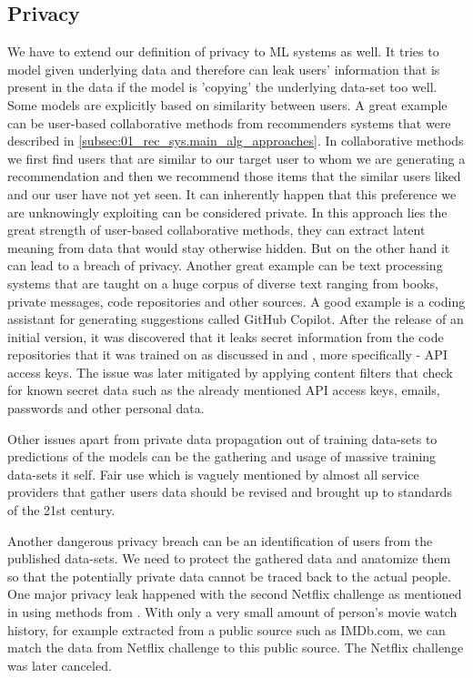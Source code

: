 \subsection{Privacy}
We have to extend our definition of privacy to ML systems as well. It tries to model given underlying data and therefore can leak users' information that is present in the data if the model is 'copying' the underlying data-set too well. Some models are explicitly based on similarity between users. A great example can be user-based collaborative methods from recommenders systems that were described in \ref{subsec:01_rec_sys.main_alg_approaches}. In collaborative methods we first find users that are similar to our target user to whom we are generating a recommendation and then we recommend those items that the similar users liked and our user have not yet seen. It can inherently happen that this preference we are unknowingly exploiting can be considered private. In this approach lies the great strength of user-based collaborative methods, they can extract latent meaning from data that would stay otherwise hidden. But on the other hand it can lead to a breach of privacy.
Another great example can be text processing systems that are taught on a huge corpus
of diverse text ranging from books, private messages, code repositories and other sources. A good example is a coding assistant for generating suggestions called GitHub Copilot. After the release of an initial version, it was discovered that it leaks secret information from the code repositories that it was trained on as discussed in \cite{github_copilot_leaks_2} and \cite{github_copilot_leaks}, more specifically - API access keys. The issue was later mitigated by applying content filters that check for known secret data such as the already mentioned API access keys, emails, passwords and other personal data.

Other issues apart from private data propagation out of training data-sets to predictions of the models can be the gathering and usage of massive training data-sets it self. Fair use which is vaguely mentioned by almost all service providers that gather users data should be revised and brought up to standards of the 21st century.

Another dangerous privacy breach can be an identification of users from the published data-sets. We need to protect the gathered data and anatomize them so that the potentially private data cannot be traced back to the actual people. One major privacy leak happened with the second Netflix challenge as mentioned in \cite{netflix_leak_2010} using methods from \cite{netflix_leak_method_2008}. With only a very small amount of person's movie watch history, for example extracted from a public source such as IMDb.com, we can match the data from Netflix challenge to this public source. The Netflix challenge was later canceled.

